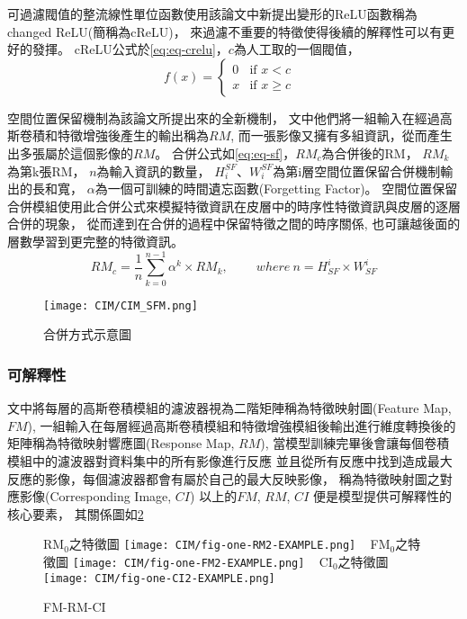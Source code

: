 \documentclass[class=NCU_thesis, crop=false]{standalone}
\begin{document}
可過濾閥值的整流線性單位函數使用該論文中新提出變形的ReLU函數稱為changed ReLU(簡稱為cReLU)，
來過濾不重要的特徵使得後續的解釋性可以有更好的發揮。
cReLU公式於\cref{eq:eq-crelu}，$c$為人工取的一個閥值，
\begin{equation}
    \label{eq:eq-crelu}
    f(x)= 
    \begin{cases}
        0 & \text{if  $x < c$ }\\
        x & \text{if  $x \geq c$}
    \end{cases}
\end{equation}

空間位置保留機制為該論文所提出來的全新機制，
文中他們將一組輸入在經過高斯卷積和特徵增強後產生的輸出稱為$RM$,
而一張影像又擁有多組資訊，從而產生出多張屬於這個影像的$RM$。
合併公式如\cref{eq:eq-sf}，$RM_{c}$為合併後的RM，
$RM_{k}$為第k張RM，
$n$為輸入資訊的數量，
${H}_{i}^{SF}$、${W}_{i}^{SF}$為第i層空間位置保留合併機制輸出的長和寬，
$\alpha$為一個可訓練的時間遺忘函數(Forgetting Factor)。
空間位置保留合併模組使用此合併公式來模擬特徵資訊在皮層中的時序性特徵資訊與皮層的逐層合併的現象，
從而達到在合併的過程中保留特徵之間的時序關係,
也可讓越後面的層數學習到更完整的特徵資訊。
\begin{equation}
    \label{eq:eq-sf}
    RM_{c}=\frac{1}{n} \sum_{k = 0}^{n-1} \alpha^{k} \times RM_{k},  \qquad \ where\ n = \textit{H}^{i}_{SF} \times \textit{W}^{i}_{SF}
\end{equation}

\begin{figure}[H]
  \centering
  \texttt{[image: CIM/CIM\_SFM.png]}
  \caption{合併方式示意圖~\cite{YangCNNInterpretable}}
  \label{fig:CIM_SFM}
\end{figure}


\subsubsection{可解釋性}
文中將每層的高斯卷積模組的濾波器視為二階矩陣稱為特徵映射圖(Feature Map, $FM$),
一組輸入在每層經過高斯卷積模組和特徵增強模組後輸出進行維度轉換後的矩陣稱為特徵映射響應圖(Response Map, $RM$),
當模型訓練完畢後會讓每個卷積模組中的濾波器對資料集中的所有影像進行反應
並且從所有反應中找到造成最大反應的影像，每個濾波器都會有屬於自己的最大反映影像，
稱為特徵映射圖之對應影像(Corresponding Image, $CI$)
以上的$FM$, $RM$, $CI$ 便是模型提供可解釋性的核心要素，
其關係圖如\cref{fig:one-FM2-RM2-CI2-EXAMPLE}

\begin{figure}[H]
    \centering
    \subcaptionbox
        {RM$_{0}$之特徵圖
        \label{fig:one-RM2-EXAMPLE}}
        {\texttt{[image: CIM/fig-one-RM2-EXAMPLE.png]}}
    ~
    \subcaptionbox
        {FM$_{0}$之特徵圖
        \label{fig:one-FM2-EXAMPLE}}
        {\texttt{[image: CIM/fig-one-FM2-EXAMPLE.png]}}
    ~
    \subcaptionbox
        {CI$_{0}$之特徵圖
        \label{fig:one-CI2-EXAMPLE}}
        {\texttt{[image: CIM/fig-one-CI2-EXAMPLE.png]}}
    \caption{FM-RM-CI\cite{YangCNNInterpretable}}
    \label{fig:one-FM2-RM2-CI2-EXAMPLE}
\end{figure}
\end{document}
